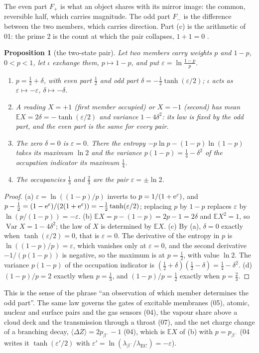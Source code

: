 \documentclass[11pt]{article}
\newtheorem{proposition}[theorem]{Proposition}
\theoremstyle{definition}\newtheorem{definition}[theorem]{Definition}
\theoremstyle{remark}\newtheorem{remark}[theorem]{Remark}
\begin{document}
The even part $F_+$ is what an object shares with its mirror image: the common, reversible half, which carries magnitude. The odd part $F_-$ is the difference between the two members, which carries direction. Part (c) is the arithmetic of 01: the prime $2$ is the count at which the pair collapses, $1+1=0$ \cite{SMath}.

\begin{proposition}[the two-state pair]\label{prop:twostate}
Let two members carry weights $p$ and $1-p$, $0<p<1$, let $\iota$ exchange them, $p\mapsto1-p$, and put $\varepsilon=\ln\frac{1-p}p$.
\begin{enumerate}[label=(\alph*)]
\item $p=\frac12+\delta$, with even part $\frac12$ and odd part $\delta=-\frac12\tanh(\varepsilon/2)$; $\iota$ acts as $\varepsilon\mapsto-\varepsilon$, $\delta\mapsto-\delta$.
\item A reading $X=+1$ (first member occupied) or $X=-1$ (second) has mean $\mathbb EX=2\delta=-\tanh(\varepsilon/2)$ and variance $1-4\delta^2$: its law is fixed by the odd part, and the even part is the same for every pair.
\item The zero $\delta=0$ is $\varepsilon=0$. There the entropy $-p\ln p-(1-p)\ln(1-p)$ takes its maximum $\ln2$ and the variance $p(1-p)=\frac14-\delta^2$ of the occupation indicator its maximum $\frac14$.
\item The occupancies $\frac13$ and $\frac23$ are the pair $\varepsilon=\pm\ln2$.
\end{enumerate}
\end{proposition}
\begin{proof}
(a) $\varepsilon=\ln((1-p)/p)$ inverts to $p=1/(1+\mathrm e^\varepsilon)$, and $p-\frac12=(1-\mathrm e^\varepsilon)/(2(1+\mathrm e^\varepsilon))=-\frac12\tanh(\varepsilon/2)$; replacing $p$ by $1-p$ replaces $\varepsilon$ by $\ln(p/(1-p))=-\varepsilon$. (b) $\mathbb EX=p-(1-p)=2p-1=2\delta$ and $\mathbb EX^2=1$, so $\operatorname{Var}X=1-4\delta^2$; the law of $X$ is determined by $\mathbb EX$. (c) By (a), $\delta=0$ exactly when $\tanh(\varepsilon/2)=0$, that is $\varepsilon=0$. The derivative of the entropy in $p$ is $\ln((1-p)/p)=\varepsilon$, which vanishes only at $\varepsilon=0$, and the second derivative $-1/(p(1-p))$ is negative, so the maximum is at $p=\frac12$, with value $\ln2$. The variance $p(1-p)$ of the occupation indicator is $(\frac12+\delta)(\frac12-\delta)=\frac14-\delta^2$. (d) $(1-p)/p=2$ exactly when $p=\frac13$, and $(1-p)/p=\frac12$ exactly when $p=\frac23$.
\end{proof}
This is the sense of the phrase ``an observation of which member determines the odd part''. The same law governs the gates of excitable membranes (05), atomic, nuclear and surface pairs and the gas sensors (04), the vapour share above a cloud deck and the transmission through a throat (07), and the net charge change of a branching decay, $\langle\Delta Z\rangle=2p_{\beta^-}-1$ (04), which is $\mathbb EX$ of (b) with $p=p_{\beta^-}$ (04 writes it $\tanh(\varepsilon'/2)$ with $\varepsilon'=\ln(\lambda_{\beta^-}/\lambda_{\mathrm{EC}})=-\varepsilon$).
\end{document}
